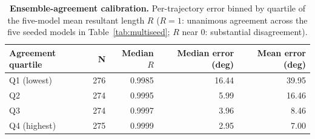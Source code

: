 \documentclass[11pt]{article}
\begin{document}
\begin{table}[h!]
    \centering
    \caption{\textbf{Ensemble-agreement calibration.} Per-trajectory error binned by quartile of the five-model mean resultant length $R$ ($R=1$: unanimous agreement across the five seeded models in Table~\ref{tab:multiseed}; $R$ near 0: substantial disagreement).}
    \begin{tabular}{@{}lrrrr@{}}
        \toprule
        Agreement quartile & N & Median $R$ & Median error (deg) & Mean error (deg) \\
        \midrule
        Q1 (lowest) & 276 & 0.9985 & 16.44 & 39.95 \\
        Q2 & 274 & 0.9995 & 5.99 & 16.46 \\
        Q3 & 274 & 0.9997 & 3.96 & 8.46 \\
        Q4 (highest) & 275 & 0.9999 & 2.95 & 7.00 \\
        \bottomrule
    \end{tabular}
    \label{tab:ensemble}
\end{table}



\end{document}
